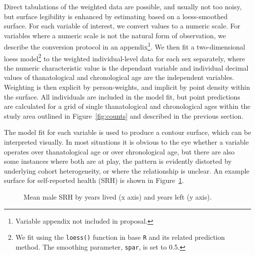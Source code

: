 \documentclass{article}
\begin{document}
Direct tabulations of the weighted data are possible, and usually not too noisy,
but surface legibility is enhanced by estimating based on a loess-smoothed
surface. For each variable of interest, we convert values to a numeric scale.
For variables where a numeric scale is not the natural form of observation, we
describe the conversion protocol in an appendix\footnote{Variable appendix not
included in proposal.}. We then fit a two-dimensional loess model\footnote{We
fit using the \texttt{loess()} function in base \texttt{R}
\citep{cleveland1992local,Rcore2013} and its related prediction method. The
smoothing parameter, \texttt{spar}, is set to 0.5.} to the weighted
individual-level data for each sex separately, where the numeric characteristic value is the dependant variable and individual decimal values of thanatological and chronological age are the independent variables.
Weighting is then explicit by person-weights, and implicit by point density
within the surface. All individuals are included in the model fit, but point
predictions are calculated for a grid of single thanatological and chronological
ages within the study area outlined in Figure~\ref{fig:counts} and described in
the previous section. 

The model fit for each variable is used to produce a contour surface, which can
be interpreted visually. In most situations it is obvious to the eye whether a
variable operates over thanatological age or over chronological age, but there
are also some instances where both are at play, the pattern is evidently
distorted by underlying cohort heterogeneity, or where the relationship is
unclear. An example surface for self-reported health (SRH) is shown in
Figure~\ref{fig:srh}.

\begin{figure}[!h]
    \centering
    \caption{Mean male SRH by years lived (x axis) and years left (y axis).}
    \label{fig:srh}
	\vspace{-2em}
\end{figure}
\end{document}
